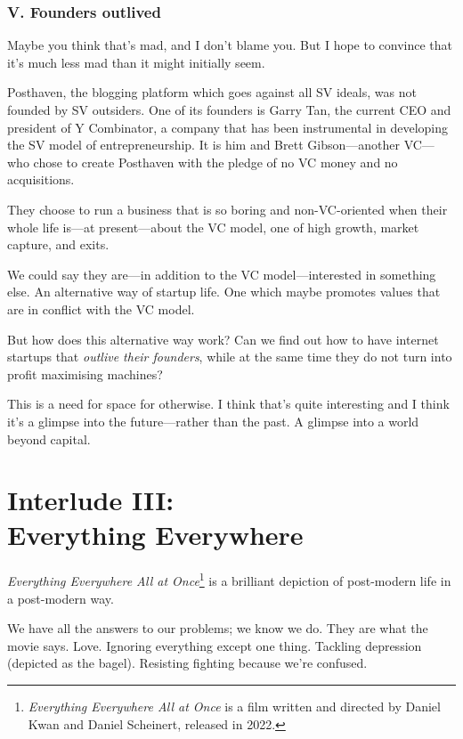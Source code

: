 \subsection{V. Founders outlived}

Maybe you think that’s mad, and I don’t blame you. But I hope to convince that it’s much less mad than it might initially seem.

Posthaven, the blogging platform which goes against all SV ideals, was not founded by SV outsiders. One of its founders is Garry Tan, the current CEO and president of Y Combinator, a company that has been instrumental in developing the SV model of entrepreneurship. It is him and Brett Gibson—another VC—who chose to create Posthaven with the pledge of no VC money and no acquisitions.

They choose to run a business that is so boring and non-VC-oriented when their whole life is—at present—about the VC model, one of high growth, market capture, and exits.

We could say they are—in addition to the VC model—interested in something else. An alternative way of startup life. One which maybe promotes values that are in conflict with the VC model.

But how does this alternative way work? Can we find out how to have internet startups that \emph{outlive their founders}, while at the same time they do not turn into profit maximising machines?

This is a need for space for otherwise. I think that’s quite interesting and I think it’s a glimpse into the future—rather than the past. A glimpse into a world beyond capital.

\chapter*{Interlude III:\\Everything Everywhere}

\emph{Everything Everywhere All at Once}\footnote{\emph{Everything Everywhere All at Once} is a film written and directed by Daniel Kwan and Daniel Scheinert, released in 2022.} is a brilliant depiction of post-modern life in a post-modern way.

We have all the answers to our problems; we know we do. They are what the movie says. Love. Ignoring everything except one thing. Tackling depression (depicted as the bagel). Resisting fighting because we’re confused.

